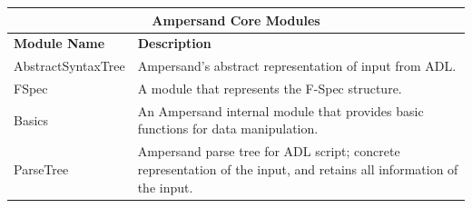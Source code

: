 \documentclass[12pt]{report}
\begin{document}
\begin{adjustbox}{center}
\begin{tabular}{ |p{3.2cm}|p{11cm}|  }
    \hline
    \multicolumn{2}{|c|}{\bfseries{\large{Ampersand Core Modules}}} \\ 
    \hline\hline
    \bfseries{Module Name} & \bfseries{Description}\\
    \hline
    AbstractSyntaxTree   & Ampersand's abstract representation of input from 
    ADL.   \\
    \hline
    FSpec &   A module that represents the F-Spec structure.\\
    \hline
    Basics & An Ampersand internal module that provides basic functions for 
    data manipulation.\\
    \hline
    ParseTree    & Ampersand parse tree for ADL script; concrete representation 
    of the input, and retains all information of the input. \\
    \hline
\end{tabular}
\end{adjustbox}
\end{document}
